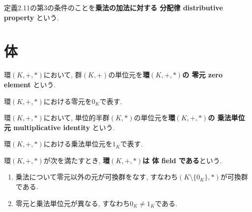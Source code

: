 定義2.11の第3の条件のことを{\bf 乗法の加法に対する
分配律 distributive property
}という.

\section{体}
\begin{Def}
環$(K,+,*)$において,
群$(K,+)$の単位元を{\bf 環$(K,+,*)$の
零元 zero element
}という.
\end{Def}
\begin{Notation}
環$(K,+,*)$における零元を$0_K$で表す.
\end{Notation}
\begin{Def}
環$(K,+,*)$において,
単位的半群$(K,*)$の単位元を{\bf 環$(K,+,*)$の
乗法単位元 multiplicative identity
}という.
\end{Def}
\begin{Notation}
環$(K,+,*)$における乗法単位元を$1_K$で表す.
\end{Notation}

\begin{Def}
環$(K,+,*)$が次を満たすとき, {\bf 環$(K,+,*)$は
体 field
である}という.
\begin{enumerate}
\item 乗法について零元以外の元が可換群をなす, すなわち$(K\setminus\{0_K\},*)$が可換群である.
\item 零元と乗法単位元が異なる, すなわち$0_K\neq 1_K$である.
\end{enumerate}
\end{Def}